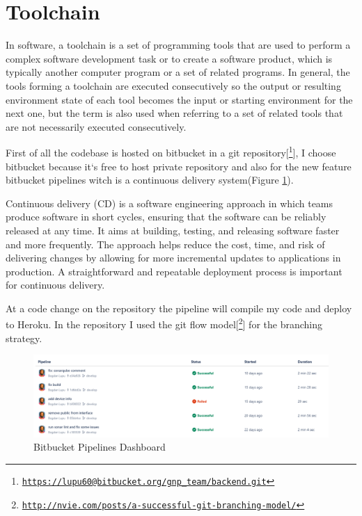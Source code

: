 \section{Toolchain}
In software, a toolchain is a set of programming tools that are used to perform a complex software development task or to create a software product, which is typically another computer program or a set of related programs. In general, the tools forming a toolchain are executed consecutively so the output or resulting environment state of each tool becomes the input or starting environment for the next one, but the term is also used when referring to a set of related tools that are not necessarily executed consecutively.
\newline

First of all the codebase is hosted on bitbucket in a git repository[\footnote{\href{https://lupu60@bitbucket.org/gnp\_team/backend.git}{\texttt{https://lupu60@bitbucket.org/gnp\_team/backend.git}}}], I choose bitbucket because it`s free to host private repository and also for the new feature bitbucket pipelines witch is a continuous delivery system(Figure \ref{fig:piplines}). 
\newline

Continuous delivery (CD) is a software engineering approach in which teams produce software in short cycles, ensuring that the software can be reliably released at any time. It aims at building, testing, and releasing software faster and more frequently. The approach helps reduce the cost, time, and risk of delivering changes by allowing for more incremental updates to applications in production. A straightforward and repeatable deployment process is important for continuous delivery.
\newline

At a code change on the repository the pipeline will compile my code and deploy to Heroku. In the repository I used the git flow model[\footnote{\href{http://nvie.com/posts/a-successful-git-branching-model/}{\texttt{http://nvie.com/posts/a-successful-git-branching-model/}}}] for the branching strategy.
\begin{figure}[h]
	\centering
	\includegraphics[width=\linewidth]{images/pipelines}
	\caption{Bitbucket Pipelines Dashboard}
	\label{fig:piplines}
\end{figure}

